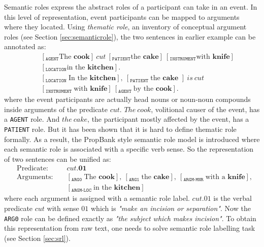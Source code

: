 \documentclass[a4paper]{article}
\begin{document}
Semantic roles express the abstract roles of a participant can take in an event. In this level of representation, event participants can be mapped to arguments where they located. Using \textit{thematic role}, an inventory of conceptual argument roles (see Section \ref{sec:semanticrole}), the two sentences in earlier example can be annotated as: 
\begin{eqnarray} \label{eg:thematic}
    \nonumber & &[_{\texttt{AGENT}} \text{The }\textbf{cook}]\ cut\ [_{\texttt{PATIENT}}\text{the }\textbf{cake}]\ [_{\texttt{INSTRUMENT}}\text{with }\textbf{knife}]\\  
    &   &[_{\texttt{LOCATION}}\text{in the }\textbf{kitchen}]. \\
    \nonumber & &[_{\texttt{LOCATION }}\text{In the }\textbf{kitchen}],\ [_{\texttt{PATIENT }}\text{the }\textbf{cake }]\ is \ cut\ \\
    &   &[_{\texttt{INSTRUMENT }}\text{with }\textbf{knife}]\ [_{\texttt{AGENT }}\text{by the }\textbf{cook}]. 
\end{eqnarray} 
where the event participants are actually head nouns or noun-noun compounds inside arguments of the predicate $cut$. $The\ cook$, volitional causer of the event, has a \texttt{AGENT} role. And $the\ cake$, the participant mostly affected by the event, has a \texttt{PATIENT} role. But it has been shown that it is hard to define thematic role formally. As a result, the PropBank \citep{palmer2005proposition} style semantic role model is introduced where each semantic role is associated with a specific verb sense. So the representation of two sentences can be unified as: 
\begin{equation*} \label{eg:probank}
\begin{aligned}
    & \text{Predicate: }&&cut.\textbf{01} \\
    & \text{Arguments: }&&[_{\texttt{ARG0 }}\text{The }\textbf{cook}], \ [_{\texttt{ARG1 }}\text{the }\textbf{cake}], \ [_{\texttt{ARGM-MNR }}\text{with a }\textbf{knife}], \\
    &                   &&[_{\texttt{ARGM-LOC }}\text{in the }\textbf{kitchen}]
\end{aligned}
\end{equation*} 
where each argument is assigned with a semantic role label. $cut.01$ is the verbal predicate $cut$ with sense $01$ which is \textit{"make an incision or separation"}. Now the \texttt{ARG0} role can be defined exactly as \textit{"the subject which makes incision"}. To obtain this representation from raw text, one needs to solve semantic role labelling task (see Section \ref{sec:srl}). 
\end{document}
